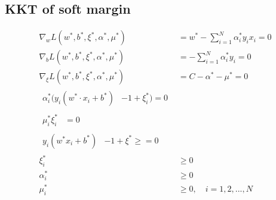 \documentclass[oneside, 12pt]{ctexbook}
\begin{document}
			\subsection{\quad KKT of soft margin}
				\begin{align}
					\nabla_w L(w^*, b^*, \xi^*, \alpha^*, \mu^*) &= w^* - \sum_{i=1}^{N} \alpha_i^* y_i x_i = 0 \\
					\nabla_b L(w^*, b^*, \xi^*, \alpha^*, \mu^*) &= -\sum_{i=1}^{N} \alpha_i^* y_i = 0 \\
					\nabla_\xi L(w^*, b^*, \xi^*, \alpha^*, \mu^*) &= C - \alpha^* - \mu^* = 0 \\
					\begin{split}
						\alpha_i^* (y_i(w^* \cdot x_i + b^*)& - 1 + \xi_i^*) = 0
					\end{split} \label{alpha_euqal_restrict_kkt_soft_margin}
					\\
					\begin{split}
						\mu_i^* \xi_i^* &= 0
					\end{split} \label{xi_equal_restrict_kkt_soft_margin}
					\\
					\begin{split}
						y_i(w^* x_i + b^*) &- 1 + \xi^* \geq = 0
					\end{split} \label{not_equal_restrict_kkt_soft_margin}
					\\
					\xi_i^* &\geq 0\\
					\alpha_i^* &\geq 0\\
					\mu_i^* &\geq 0, \quad i=1,2,...,N
				\end{align}
			
\end{document}
